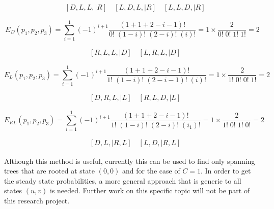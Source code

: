 \begin{align*}
    & [D, L, L, | R] \quad [L, D, L, | R] \quad [L, L, D, | R]
\end{align*}


\begin{equation*}
    E_D(p_1, p_2, p_3) = \sum_{i=1}^{1} (-1)^{i+1} \frac{(1+1+2-i-1)!}{0! \;
    (1-i)! \; (2-i)! \; (i)!} = 1 \times \frac{2}{0! \; 0! \; 1! \; 1!} = 2
\end{equation*}

\begin{align*}
    & [R, L, L, | D] \quad [L, R, L, | D]
\end{align*}


\begin{equation*}
    E_L(p_1, p_2, p_3) = \sum_{i=1}^{1} (-1)^{i+1}
    \frac{(1+1+2-i-1)!}{1! \; (1-i)! \; (2-i-1)! \; (i)!}
    = 1 \times \frac{2}{1! \; 0! \; 0! \; 1!} = 2
\end{equation*}

\begin{align*}
    & [D, R, L, | L] \quad [R, L, D, | L]
\end{align*}


\begin{equation*}
    E_{RL}(p_1, p_2, p_3) = \sum_{i=1}^{1} (-1)^{i+1}
    \frac{(1+1+2-i-1)!}{1! \; (1-i)! \; (2-i)! \; (i_1)!}
    = 1 \times \frac{2}{1! \; 0! \; 1! \; 0!} = 2
\end{equation*}

\begin{align*}
    & [D, L, | R, L] \quad [L, D, | R, L]
\end{align*}


Although this method is useful, currently this can be used to find only spanning
trees that are rooted at state \((0,0)\) and for the case of \(C = 1\).
In order to get the steady state probabilities, a more general approach that is
generic to all states \((u,v)\) is needed.
Further work on this specific topic will not be part of this research project.
